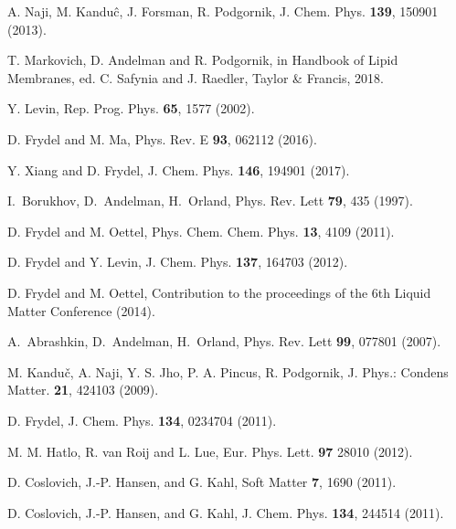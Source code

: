 \documentclass[pre,twocolumn,graphicx]{revtex4-1}
\begin{document}
\begin{thebibliography}{99}

A. Naji, M. Kandu\^ c, J. Forsman, R. Podgornik, J. Chem. Phys. {\bf 139}, 150901 (2013).

T. Markovich, D. Andelman and R. Podgornik, in Handbook of Lipid Membranes, ed. C. Safynia and J. Raedler, Taylor \& Francis, 2018.


Y. Levin, Rep. Prog. Phys. {\bf 65}, 1577 (2002). 

D. Frydel and M. Ma, Phys. Rev. E {\bf 93}, 062112 (2016).

Y. Xiang and D. Frydel, J. Chem. Phys. {\bf 146}, 194901 (2017).




I.~Borukhov, D.~Andelman, H.~Orland,  Phys. Rev. Lett {\bf 79}, 435 (1997).

D. Frydel and M. Oettel, Phys. Chem. Chem. Phys. {\bf 13}, 4109 (2011).  

D. Frydel and Y. Levin, J. Chem. Phys. {\bf 137}, 164703 (2012).  

D. Frydel and M. Oettel, Contribution to the proceedings of the 6th Liquid Matter Conference (2014).  




A.~Abrashkin, D.~Andelman, H.~Orland,  Phys. Rev. Lett {\bf 99}, 077801 (2007).

M. Kandu\v c, A. Naji, Y. S. Jho, P. A. Pincus, R. Podgornik, J. Phys.: Condens Matter. {\bf 21}, 424103 (2009).




D. Frydel, J. Chem. Phys. {\bf 134}, 0234704 (2011).  

M. M. Hatlo, R. van Roij and L. Lue, Eur. Phys. Lett. {\bf 97} 28010 (2012).




D. Coslovich, J.-P. Hansen, and G. Kahl, Soft Matter {\bf 7},  1690 (2011).

D. Coslovich, J.-P. Hansen, and G. Kahl, J. Chem. Phys. {\bf 134},  244514 (2011).


\end{thebibliography}
\end{document}
